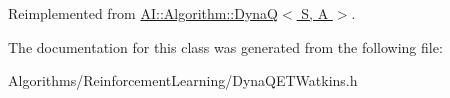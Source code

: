 Reimplemented from \hyperlink{classAI_1_1Algorithm_1_1DynaQ_a4542226b17db4ed8a2c5ec17d37dc42f}{A\-I\-::\-Algorithm\-::\-Dyna\-Q$<$ S, A $>$}.



The documentation for this class was generated from the following file\-:\begin{DoxyCompactItemize}
\item 
Algorithms/\-Reinforcement\-Learning/Dyna\-Q\-E\-T\-Watkins.\-h\end{DoxyCompactItemize}
